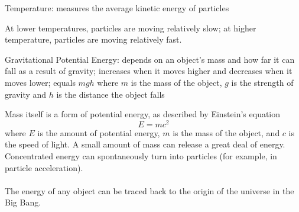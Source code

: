 \documentclass[12pt]{article}
\begin{document}
\begin{definition} Temperature: measures the average kinetic energy of particles \end{definition} 
At lower temperatures, particles are moving relatively slow; at higher temperature, particles are moving relatively fast. 
\begin{definition} Gravitational Potential Energy: depends on an object's mass and how far it can fall as a result of gravity; increases when it moves higher and decreases when it moves lower; equals $mgh$ where $m$ is the mass of the object, $g$ is the strength of gravity and $h$ is the distance the object falls \end{definition} 
Mass itself is a form of potential energy, as described by Einstein's equation $$E = mc^2$$ where $E$ is the amount of potential energy, $m$ is the mass of the object, and $c$ is the speed of light. A small amount of mass can release a great deal of energy. Concentrated energy can spontaneously turn into particles (for example, in particle acceleration).  \\~\\ 
The energy of any object can be traced back to the origin of the universe in the Big Bang. 
\end{document}
